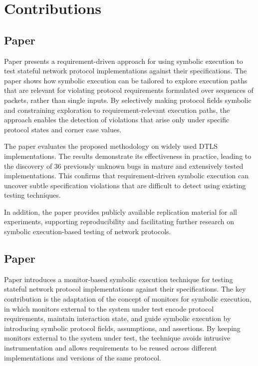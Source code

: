 \chapter{Contributions}\label{chapter:contributions}

\section{Paper }
Paper  presents a requirement-driven approach for using symbolic execution to test stateful network protocol implementations against their specifications.
The paper shows how symbolic execution can be tailored to explore execution paths that are relevant for violating protocol requirements formulated over sequences of packets, rather than single inputs.
By selectively making protocol fields symbolic and constraining exploration to requirement-relevant execution paths, the approach enables the detection of violations that arise only under specific protocol states and corner case values.

The paper evaluates the proposed methodology on widely used DTLS implementations.
The results demonstrate its effectiveness in practice, leading to the discovery of 36 previously unknown bugs in mature and extensively tested implementations.
This confirms that requirement-driven symbolic execution can uncover subtle specification violations that are difficult to detect using existing testing techniques.

In addition, the paper provides publicly available replication material for all experiments, supporting reproducibility and facilitating further research on symbolic execution-based testing of network protocols.

\section{Paper }
Paper  introduces a monitor-based symbolic execution technique for testing stateful network protocol implementations against their specifications.
The key contribution is the adaptation of the concept of monitors for symbolic execution, in which monitors external to the system under test encode protocol requirements, maintain interaction state, and guide symbolic execution by introducing symbolic protocol fields, assumptions, and assertions.
By keeping monitors external to the system under test, the technique avoids intrusive instrumentation and allows requirements to be reused across different implementations and versions of the same protocol.

